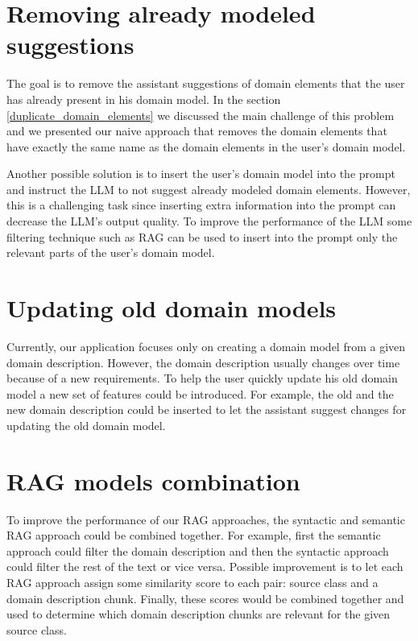 \section{Removing already modeled suggestions}

The goal is to remove the assistant suggestions of domain elements that the user has already present in his domain model. In the section \ref{duplicate_domain_elements} we discussed the main challenge of this problem and we presented our naive approach that removes the domain elements that have exactly the same name as the domain elements in the user's domain model.

Another possible solution is to insert the user's domain model into the prompt and instruct the LLM to not suggest already modeled domain elements. However, this is a challenging task since inserting extra information into the prompt can decrease the LLM's output quality. To improve the performance of the LLM some filtering technique such as RAG can be used to insert into the prompt only the relevant parts of the user's domain model.


\section{Updating old domain models}

Currently, our application focuses only on creating a domain model from a given domain description. However, the domain description usually changes over time because of a new requirements. To help the user quickly update his old domain model a new set of features could be introduced. For example, the old and the new domain description could be inserted to let the assistant suggest changes for updating the old domain model.


\section{RAG models combination}

To improve the performance of our RAG approaches, the syntactic and semantic RAG approach could be combined together. For example, first the semantic approach could filter the domain description and then the syntactic approach could filter the rest of the text or vice versa. Possible improvement is to let each RAG approach assign some similarity score to each pair: source class and a domain description chunk. Finally, these scores would be combined together and used to determine which domain description chunks are relevant for the given source class.
